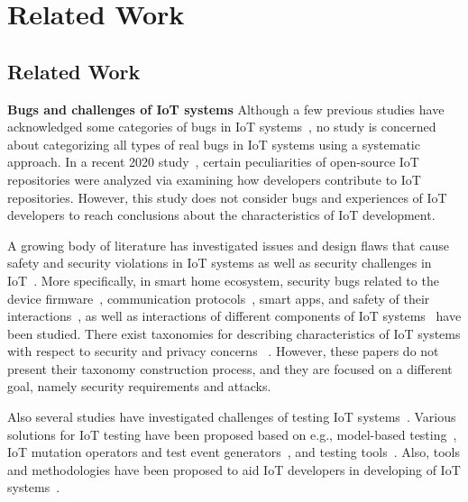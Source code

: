 
\chapter{Related Work}
\label{ch:literature}
\section{Related Work}
\textbf{Bugs and challenges of IoT systems}
Although a few previous studies have acknowledged some categories of bugs in IoT systems~\cite{IoTOSBugs,chen2017application,hnat2011hitchhiker}, no study is concerned about categorizing all types of real bugs in IoT systems using a systematic approach. In a recent 2020 study~\cite{IoTOSS2020}, certain peculiarities of open-source IoT repositories were analyzed via examining how developers contribute to IoT repositories. However, this study does not consider bugs and experiences of IoT developers to reach conclusions about the characteristics of IoT development.

A growing body of literature has investigated issues and design flaws that cause safety and security violations in IoT systems as well as security challenges in IoT~\cite{IoTSecChallenges2017,edgeChallengesSurvey2019}. More specifically, in smart home ecosystem, security bugs related to the device firmware~\cite{nestFirmwareSecu,firmwareSec2017,firmwareSec2014}, communication protocols~\cite{protocolSec2017,protsec2016,fouladi2013honey}, smart apps, and safety of their interactions~\cite{celik2019iotguard,celik2018soteria,ISSTA2020Interactions}, as well as interactions of different components of IoT systems~\cite{securityUsenix2019} have been studied. There exist taxonomies for describing characteristics of IoT systems with respect to security and privacy concerns~\cite{alqassem2014taxonomy} \cite{chen2018internet}. However, these papers do not present their taxonomy construction process, and they are focused on a different goal, namely security requirements and attacks.

Also several studies have investigated challenges of testing IoT systems~\cite{ahmadMDBtesting2016,rosenkranz2015Testing,testingtools2018,voas2018testing}. Various solutions for IoT testing have been proposed based on e.g., model-based testing~\cite{ahmadMDBtesting2016}, IoT mutation operators and test event generators~\cite{gutierrez2019evolutionary,gutierrez2018iot}, and testing tools~\cite{testingtools2018}. Also, tools and methodologies have been proposed to aid IoT developers in developing of IoT systems~\cite{MorinUMLforIoT2017,krishna2019iot,corno2019towards}. 

